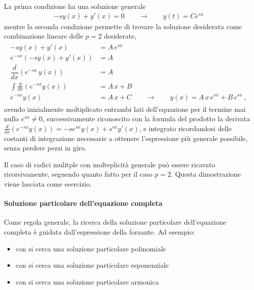 \documentclass[letterpaper,10pt,italian]{jupyterBook}
\begin{document}
\sphinxAtStartPar
La prima condizione ha una soluzione generale
\begin{equation*}
\begin{split}- s y(x) + y'(x) = 0 \qquad \rightarrow \qquad y(t) = C e^{s x}\end{split}
\end{equation*}
\sphinxAtStartPar
mentre la seconda condizione permette di trovare la soluzione desiderata come combinazione lineare delle \(p=2\) desiderate,
\begin{equation*}
\begin{split}\begin{aligned}
  - s y(x) + y'(x) & = A \, e^{sx}  \\
  e^{-sx} \left( - s y(x) + y'(x) \right) & = A  \\
  \dfrac{d}{dx} \left( e^{-sx} \, y(x) \right) & = A  \\
  \int \frac{d}{dx} \left( e^{-sx} y(x) \right) & = A \, x + B \\
   e^{-sx} y(x) & = A \, x + C \qquad \rightarrow \qquad  y(x) = A \, x \, e^{sx} + B \, e^{sx}  \ ,
\end{aligned}\end{split}
\end{equation*}
\sphinxAtStartPar
avendo inizialmente moltiplicato entrambi lati dell’equazione per il termine mai nullo \(e^{sx} \ne 0\), successivamente riconoscito con la formula del prodotto la derivata \(\frac{d}{dx}\left( e^{-s x} y(x) \right) = - s e^{sx} y(x) + s^{sx} y'(x)\), e integrato ricordandosi delle costanti di integrazione necessarie a ottenere l’espressione più generale possibile, senza perdere pezzi in giro.

\sphinxAtStartPar
{} Il caso di radici mulitple con molteplicità generale può essere ricavato ricorsivamente, seguendo quanto fatto per il caso \(p=2\). Questa dimostrazione viene lasciata come esercizio.


\paragraph{Soluzione particolare dell’equazione completa}
\label{\detokenize{ch/ode:soluzione-particolare-dell-equazione-completa}}\label{\detokenize{ch/ode:ode-hs-types-linear-const-sol-part}}
\sphinxAtStartPar
Come regola generale, la ricerca della soluzione particolare dell’equazione completa è guidata dall’espressione della forzante. Ad esempio:
\begin{itemize}
\item {} 
\sphinxAtStartPar
con  si cerca una soluzione particolare polinomiale

\item {} 
\sphinxAtStartPar
con  si cerca una soluzione particolare esponenziale

\item {} 
\sphinxAtStartPar
con  si cerca una soluzione particolare armonica

\end{itemize}
\end{document}
